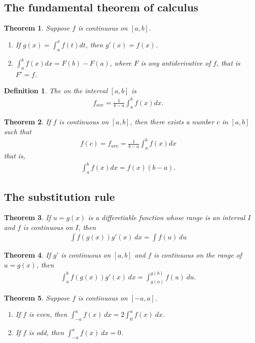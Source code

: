 \documentclass{article}
\theoremstyle{sltheorem}
\newtheorem{definition}{Definition}[section]
\newtheorem{theorem}{Theorem}[section]
\begin{document}
\subsection{The fundamental theorem of calculus}
\begin{theorem}
   Suppose $f$ is continuous on $[a,b]$.
   \begin{enumerate}
       \item If $g(x)=\int_a^x f(t)dt$, then $g'(x)=f(x)$.
       \item $\int_a^b f(x)dx=F(b)-F(a)$, where $F$ is any antiderivative of $f$, that is $F'=f$.
   \end{enumerate}
\end{theorem}
\begin{definition}
    The  on the interval $[a,b]$ is
    \begin{align*}
        f_{ave}=\frac{1}{b-a}\int_a^b f(x)dx.
    \end{align*}
\end{definition}
\begin{theorem}
     If $f$ is continuous on $[a,b]$, then there exists a number $c$ in $[a,b]$ such that
    \begin{align*}
        f(c)=f_{ave}=\frac{1}{b-a}\int_a^b f(x)dx
    \end{align*}
    that is,
    \begin{align*}
        \int_a^b f(x)dx=f(x)(b-a).
    \end{align*}
\end{theorem}
\subsection{The substitution rule}
\begin{theorem}
    If $u=g(x)$ is a differetiable function whose range is an interval $I$ and $f$ is continuous on $I$, then
    \begin{align*}
        \int f(g(x))g'(x)\:dx=\int f(u)\:du
    \end{align*}
\end{theorem}
\begin{theorem}
    If $g'$ is continuous on $[a,b]$ and $f$ is continuous on the range of $u=g(x)$, then 
    \begin{align*}
        \int_a^b f(g(x))g'(x)\:dx=\int_{g(a)}^{g(b)}f(u)\:du.
    \end{align*}
\end{theorem}
\begin{theorem}
     Suppose $f$ is continuous on $[-a,a]$.
    \begin{enumerate}
        \item If $f$ is even, then $\int_{-a}^a f(x)\:dx= 2\int_0^a f(x)\:dx$.
        \item If $f$ is odd, then $\int_{-a}^a f(x)\:dx = 0$.
    \end{enumerate}
\end{theorem}
\end{document}
